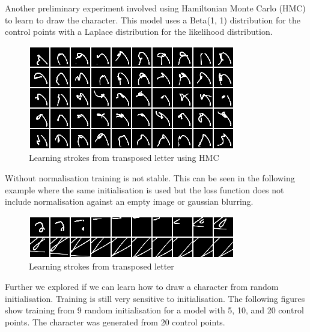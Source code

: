 \documentclass{article}
\begin{document}
Another preliminary experiment involved using Hamiltonian Monte Carlo
(HMC) to learn to draw the character. This model uses a Beta(1, 1)
distribution for the control points with a Laplace distribution for
the likelihood distribution.

\begin{figure}[htb!]
\centering
\includegraphics[scale=0.75]{../results/recons_pyro}
\caption{Learning strokes from transposed letter using HMC}
\label{fig:shiftedinithmc}
\end{figure}

Without normalisation training is not stable. This can be seen in
the following example where the same initialisation is used but
the loss function does not include normalisation against an empty
image or gaussian blurring.

\begin{figure}[htb!]
\centering
\includegraphics[scale=0.75]{../results/recons_nogauss}
\caption{Learning strokes from transposed letter}
\label{fig:shiftedinitnogauss}
\end{figure}

Further we explored if we can learn how to draw a character from
random initialisation. Training is still very sensitive to
initialisation. The following figures show training from 9 random
initialisation for a model with 5, 10, and 20 control points. The
character was generated from 20 control points.
\end{document}
